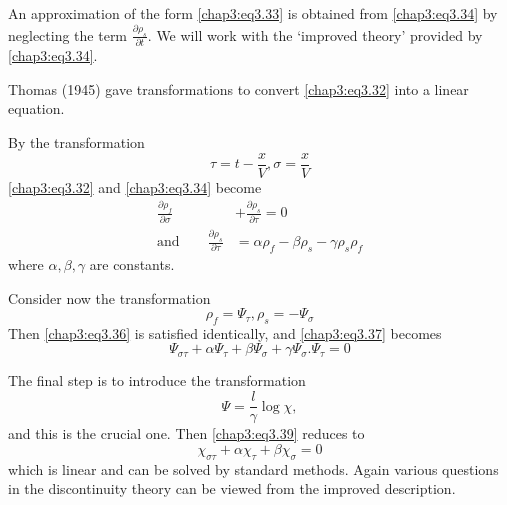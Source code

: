 An approximation of the form \eqref{chap3:eq3.33} is obtained from \eqref{chap3:eq3.34} by neglecting the term $\frac{\partial\rho_s}{\partial t}$. We will work with the `improved theory' provided by \eqref{chap3:eq3.34}.

Thomas (1945) gave transformations to convert \eqref{chap3:eq3.32} into a linear equation.
\begin{step}
By the transformation
\begin{equation}
\tau=t-\frac{x}{V},\sigma=\frac{x}{V}\tag{3.35}\label{chap3:eq3.35}
\end{equation}
\eqref{chap3:eq3.32} and \eqref{chap3:eq3.34} become 
\begin{align}
\frac{\partial\rho_f}{\partial\sigma}&+\frac{\partial\rho_s}{\partial\tau}=0\tag{3.36}\label{chap3:eq3.36}\\
\text{and}\qquad \frac{\partial\rho_s}{\partial\tau}&=\alpha\rho_f-\beta \rho_s- \gamma\rho_s\rho_f\tag{3.37}\label{chap3:eq3.37}
\end{align}
where $\alpha,\beta,\gamma$ are constants.
\end{step}\label{chap3:stp1}

\begin{step}
Consider now the transformation
\begin{equation}
\rho_f=\Psi_\tau,\rho_s = - \Psi_\sigma\tag{3.38}\label{chap3:eq3.38}
\end{equation}
Then \eqref{chap3:eq3.36} is satisfied identically, and \eqref{chap3:eq3.37} becomes 
\begin{equation}
\Psi_{\sigma\tau}+\alpha\Psi_\tau +\beta\Psi_\sigma +\gamma\Psi_\sigma .\Psi_\tau=0 \tag{3.39}\label{chap3:eq3.39}
\end{equation}
\end{step}\label{chap3:stp2}

\begin{step}
The final step is to introduce the transformation
\begin{equation}
\Psi=\frac{l}{\gamma}\log\chi,\tag{3.40}\label{chap3:eq3.40}
\end{equation}\pageoriginale
and this is the crucial one. Then \eqref{chap3:eq3.39} reduces to 
\begin{equation}
\chi_{\sigma\tau}+\alpha\chi_\tau +\beta\chi_\sigma =0 \tag{3.41}\label{chap3:eq3.41}
\end{equation}
which is linear and can be solved by standard methods. Again various questions in the discontinuity theory can be viewed from the improved description.
\end{step}\label{chap3:stp3}

